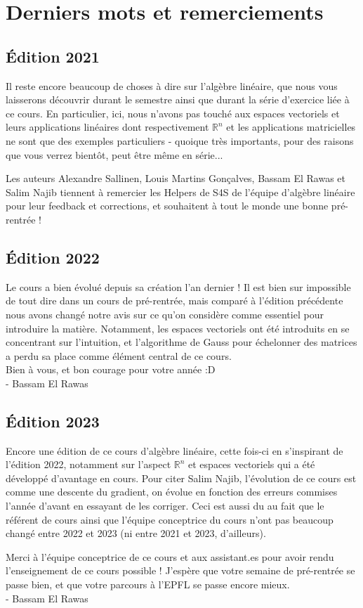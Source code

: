 \documentclass[oneside,12pt,french,table]{book}
\theoremstyle{definition}
\theoremstyle{plain}
\theoremstyle{remark}
\theoremstyle{plain}
\theoremstyle{plain}
\theoremstyle{plain}
\newcommand{\R}{\mathbb{R}}
\begin{document}
\chapter{Derniers mots et remerciements}
\section*{Édition 2021}
Il reste encore beaucoup de choses à dire sur l’algèbre linéaire, que nous vous laisserons découvrir durant le semestre ainsi que durant la série d’exercice liée à ce cours. En particulier, ici, nous n’avons pas touché aux espaces vectoriels et leurs applications linéaires dont respectivement $\R^n$ et les applications matricielles ne sont que des exemples particuliers - quoique très importants, pour des raisons que vous verrez bientôt, peut être même en série...

Les auteurs Alexandre Sallinen, Louis Martins Gonçalves, Bassam El Rawas et Salim Najib tiennent à remercier les Helpers de S4S de l’équipe d’algèbre linéaire pour leur feedback et corrections, et souhaitent à tout le monde une bonne pré-rentrée !

\section*{Édition 2022}
Le cours a bien évolué depuis sa création l'an dernier ! Il est bien sur impossible de tout dire dans un cours de pré-rentrée, mais comparé à l'édition précédente nous avons changé notre avis sur ce qu'on considère comme essentiel pour introduire la matière. Notamment, les espaces vectoriels ont été introduits en se concentrant sur l'intuition, et l'algorithme de Gauss pour échelonner des matrices a perdu sa place comme élément central de ce cours. \\

Bien à vous, et bon courage pour votre année :D \\
- Bassam El Rawas

\section*{Édition 2023}
Encore une édition de ce cours d'algèbre linéaire, cette fois-ci en s'inspirant de l'édition 2022, notamment sur l'aspect $\R^n$ et espaces vectoriels qui a été développé d'avantage en cours. Pour citer Salim Najib, l'évolution de ce cours est comme une descente du gradient, on évolue en fonction des erreurs commises l'année d'avant en essayant de les corriger. Ceci est aussi du au fait que le référent de cours ainsi que l'équipe conceptrice du cours n'ont pas beaucoup changé entre 2022 et 2023 (ni entre 2021 et 2023, d'ailleurs). 

Merci à l'équipe conceptrice de ce cours et aux assistant.es pour avoir rendu l'enseignement de ce cours possible ! J'espère que votre semaine de pré-rentrée se passe bien, et que votre parcours à l'EPFL se passe encore mieux. \\
- Bassam El Rawas
\end{document}

